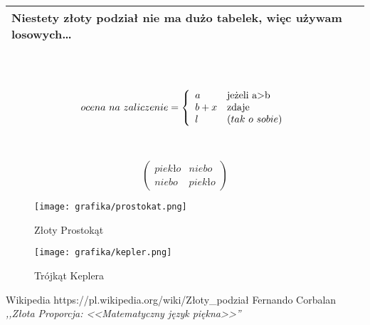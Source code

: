 \documentclass{article}
\begin{document}
\newpage
\begin{tabular}{|p{11cm}|} \hline
Niestety złoty podział nie ma dużo tabelek, więc używam losowych\ldots\\ \hline
\end{tabular}
\\\\
\begin{displaymath}
ocena~na~zaliczenie = \left\{ \begin{array}{ll}
a & \textrm{jeżeli a>b}\\
b+x & \textrm{zdaje}\\
l & \textrm(tak~o~sobie)
\end{array} \right.
\end{displaymath}
\\\\
\begin{displaymath}
\left(\begin{array}{c|c}
piekło & niebo \\ \hline
niebo & piekło
\end{array}\right)
\end{displaymath}
\newpage
\begin{figure}
\centering
\texttt{[image: grafika/prostokat.png]}
\caption{Złoty Prostokąt}
\label{fig:prostokat}
\centering
\texttt{[image: grafika/kepler.png]}
\caption{Trójkąt Keplera}
\label{fig:kepler}
\end{figure}
\newpage
\begin{thebibliography}{99}
 Wikipedia
https://pl.wikipedia.org/wiki/Złoty\_podział
 Fernando Corbalan
\emph{,,Złota Proporcja: <<Matematyczny język piękna>>''}
\end{thebibliography}
\end{document}
